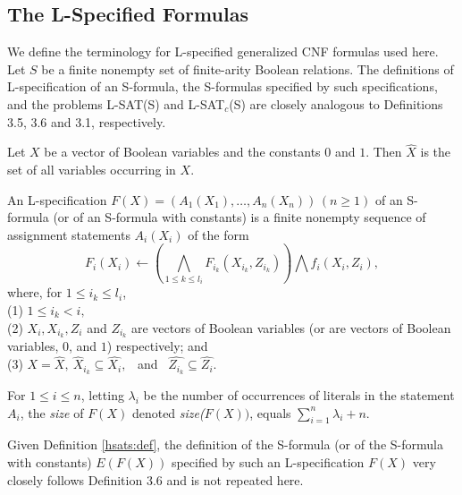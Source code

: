 \subsection{The L-Specified Formulas}\label{sec:lspec}
We define the terminology for {\sf L-}specified generalized {\sf CNF} formulas used here. 
Let $S$ be a finite nonempty set of finite-arity Boolean 
relations. The definitions of L-specification of an S-formula, the 
S-formulas specified by such specifications, and the problems 
{\sf L-SAT(S)} and {\sf L-SAT}$_c${\sf (S)} are closely analogous to Definitions
3.5, 3.6 and 3.1, respectively.

\begin{definition}
Let $X$ be a vector of Boolean variables and the constants $0$ and $1$. Then
$\hat{X}$ is the set of all variables occurring in $X.$
\end{definition}

\begin{definition}\label{hsats:def}
An {\sf L-}specification $F(X) = (A_1(X_1),\ldots, A_n(X_n))\, (n \geq 1)$ 
of an S-formula (or of an S-formula with constants) is a finite nonempty 
sequence of assignment statements $A_i(X_i)$ of the form 
\[ F_i(X_i) \leftarrow 
(\bigwedge_{1 \leq k \leq  l_i} F_{i_k}(X_{i_k},Z_{i_k})) \bigwedge 
f_i(X_i,Z_i), \]
where, for $1 \leq i_k \leq l_i$,\\
(1) $1 \leq i_k < i,$ \\
(2) $X_i, X_{i_k}, Z_i$ and $Z_{i_k}$ are vectors of Boolean variables (or are 
vectors of Boolean variables, $0$, and $1$) respectively; and \\
(3) $X = \hat{X},~ \hat{X}_{i_k} \subseteq \hat{X_i},$ ~and~ $ \hat{Z_{i_k}} 
\subseteq \hat{Z_i}$. 

\smallskip

\noindent
For $1 \leq i \leq n$, letting $\lambda_i$ be the number of occurrences of
literals in the statement $A_i$, the {\em size} of $F(X)$ denoted 
{\em size($F(X))$}, equals $\sum_{i=1}^{n} \lambda_i + n$.
\end{definition}

Given Definition \ref{hsats:def}, the definition of the 
{\sf S-formula} (or of the {\sf S}-formula with constants) 
$E(F(X))$ specified
by such an  L-specification $F(X)$ very closely follows Definition 3.6 and 
is not repeated here. 





